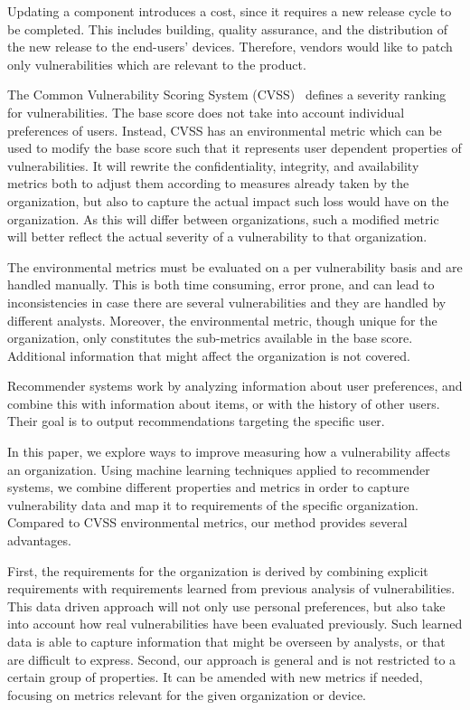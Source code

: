 {Updating a component introduces a cost, since it requires a new release cycle to be completed.
This includes building, quality assurance, and the distribution of the new release to the end-users' devices.
Therefore, vendors would like to patch only vulnerabilities which are relevant to the product.

The Common Vulnerability Scoring System (CVSS)~\cite{cvss2spec,cvss3spec} defines a severity ranking for vulnerabilities.
The base score does not take into account individual preferences of users. Instead, CVSS has an environmental metric which can be used to modify the base score such that it represents user dependent properties of vulnerabilities. It will rewrite the confidentiality, integrity, and availability metrics both to adjust them according to measures already taken by the organization, but also to capture the actual impact such loss would have on the organization. As this will differ between organizations, such a modified metric will better reflect the actual severity of a vulnerability to that organization. 

The environmental metrics must be evaluated on a per vulnerability basis and are handled manually. This is both time consuming, error prone, and can lead to inconsistencies in case there are several vulnerabilities and they are handled by different analysts. Moreover, the environmental metric, though unique for the organization, only constitutes the sub-metrics available in the base score. Additional information that might affect the organization is not covered.

Recommender systems work by analyzing information about user preferences, and combine this with information about items, or with the history of other users.
Their goal is to output recommendations targeting the specific user.

In this paper, we explore ways to improve measuring how a vulnerability affects an organization. Using machine learning techniques applied to recommender systems, we combine different properties and metrics in order to capture vulnerability data and map it to requirements of the specific organization. Compared to CVSS environmental metrics, our method provides several advantages.

First, the requirements for the organization is derived by combining explicit requirements with requirements learned from previous analysis of vulnerabilities. This data driven approach will not only use personal preferences, but also take into account how real vulnerabilities have been evaluated previously. Such learned data is able to capture information that might be overseen by analysts, or that are difficult to express. Second, our approach is general and is not restricted to a certain group of properties. It can be amended with new metrics if needed, focusing on metrics relevant for the given organization or device. 

}
